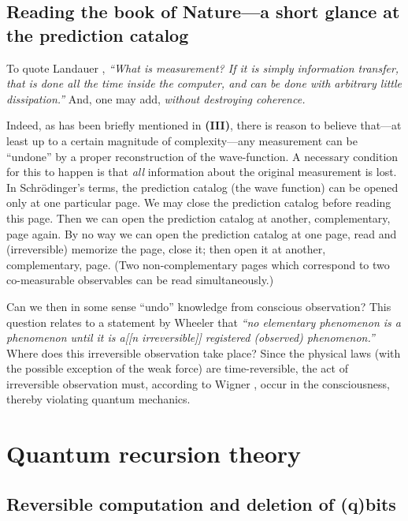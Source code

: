 \subsection{Reading the book of Nature---a short glance at the
prediction catalog}

To quote Landauer
\cite{landauer-89},
{\em ``What is measurement? If it is simply information transfer, that
is done all the time inside the computer, and can be done with arbitrary
little dissipation.''} And, one may add, {\em without destroying
coherence.}

Indeed, as has been briefly mentioned in {\bf (III)}, there is reason to
believe that---at least up to
a certain magnitude of complexity---any measurement can be ``undone'' by
a proper reconstruction of the wave-function. A necessary condition for
this to happen is that {\em all} information about the original
measurement is lost.
In Schr\"odinger's terms,
the prediction catalog
(the wave function) can be opened only at one particular page.
We may close
the prediction catalog
before reading this page. Then we can open
the prediction catalog
at another, complementary, page again.
By no way we can open
the prediction catalog at one page, read and (irreversible) memorize the
page, close it; then open it at another, complementary, page.
(Two non-complementary pages which correspond to two co-measurable
observables can be read simultaneously.)


Can we then in some sense
``undo'' knowledge from conscious observation?
This question relates to a statement  by Wheeler
\cite[p. 184]{wheeler-Zurek:83}
that {\em ``no elementary phenomenon is a phenomenon until it is a[[n
irreversible]] registered (observed) phenomenon.''}
Where does this irreversible observation take place? Since the physical
laws
 (with the possible exception of the weak force)
are time-reversible, the act of irreversible observation must, according
to Wigner \cite{wigner}, occur in the consciousness, thereby violating
quantum mechanics.


\section{Quantum recursion theory}

\subsection{Reversible computation and deletion of (q)bits}

